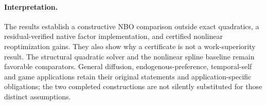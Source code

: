 \paragraph{Interpretation.}
The results establish a constructive NBO comparison outside exact quadratics,
a residual-verified native factor implementation, and certified nonlinear
reoptimization gains. They also show why a certificate is not a work-superiority
result. The structural quadratic solver and the nonlinear spline baseline
remain favorable comparators. General diffusion, endogenous-preference,
temporal-self and game applications retain their original statements and
application-specific obligations; the two completed constructions are not
silently substituted for those distinct assumptions.
